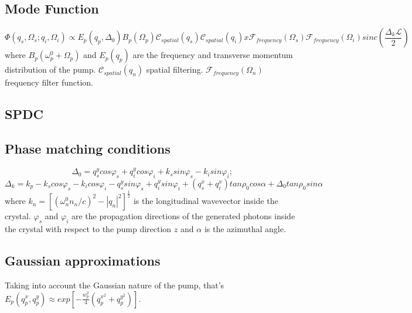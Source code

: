 
\subsection{Mode Function}


\begin{equation}
\Phi(q_s,\Omega_s;q_i,\Omega_i) \propto E_p(q_p,\Delta_0) B_p(\Omega_p) \mathcal{C}_{spatial}(q_s) \mathcal{C}_{spatial}(q_i) 
 x \mathcal{F}_{frequency}(\Omega_s) \mathcal{F}_{frequency}(\Omega_i) sinc \left( \frac{\Delta_k \mathcal{L}}{2} \right)
\end{equation}
where $B_p(\omega^0_p+\Omega_p)$ and $E_p(q_p)$ are the frequency and transverse momentum distribution of the pump. $\mathcal{C}_{spatial}(q_n)$ spatial filtering. $\mathcal{F}_{frequency}(\Omega_n)$ frequency filter function.


\subsection{SPDC}
\cite{spatiocorrelations}

\subsection{Phase matching conditions}
\begin{equation}
\Delta_0 = q^y_s cos \varphi_s + q^y_i cos \varphi_i + k_s sin \varphi_s - k_i sin \varphi_i ;
\end{equation}
\begin{equation}
\Delta_k = k_p - k_s cos \varphi_s - k_i cos \varphi_i - q^y_s sin \varphi_s + q^y_i sin \varphi_i 
+ (q^x_s + q^x_i ) tan \rho_0 cos \alpha + \Delta_0 tan \rho_0 sin \alpha 
\end{equation}
where $k_n=[(\omega^0_n n_n / c )^2 - |q_n|^2]^{\frac{1}{2}}$ is the longitudinal wavevector inside the crystal. $\varphi_s$ and $\varphi_i$ are the propagation directions of the generated photons inside the crystal with respect to the pump direction $z$ and $\alpha$ is the azimuthal angle.

\subsection{Gaussian approximations}

\cite{spatiocorrelations}

Taking into account the Gaussian nature of the pump, that's $E_p(q^x_p , q^y_p ) \approx exp \left[ -\frac{w_p^2}{4}(q^{x^2}_p + q^{y^2}_p )\right]$.

